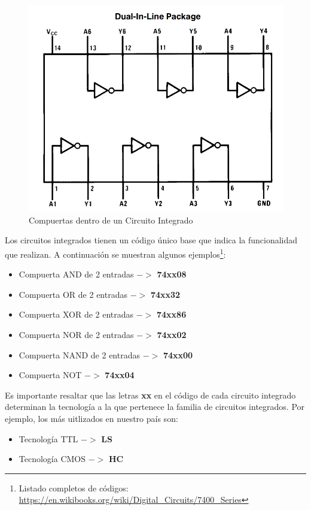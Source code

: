 \begin{figure}[H]
    \centering
    \includegraphics[scale=0.3]{images/7404.PNG}
    \caption{Compuertas dentro de un Circuito Integrado}
    \label{Fig:CompuertasEnCI}
\end{figure}

Los circuitos integrados tienen un código único base que indica la funcionalidad que realizan. A continuación se muestran algunos ejemplos\footnote{Listado completos de códigos:
\url{https://en.wikibooks.org/wiki/Digital_Circuits/7400_Series}}:

\begin{itemize}
    \item Compuerta AND de 2 entradas $->$ \textbf{74xx08}
    \item Compuerta OR de 2 entradas $->$ \textbf{74xx32}
    \item Compuerta XOR de 2 entradas $->$ \textbf{74xx86}
    \item Compuerta NOR de 2 entradas $->$ \textbf{74xx02}
    \item Compuerta NAND de 2 entradas $->$ \textbf{74xx00}
    \item Compuerta NOT $->$ \textbf{74xx04}
\end{itemize}

Es importante resaltar que las letras \textbf{xx} en el código de cada circuito integrado determinan la tecnología a la que pertenece
la familia de circuitos integrados. Por ejemplo, los más uitlizados en nuestro país son:
\begin{itemize}
    \item Tecnología TTL  $->$ \textbf{LS}
    \item Tecnología CMOS $->$ \textbf{HC}
\end{itemize}

